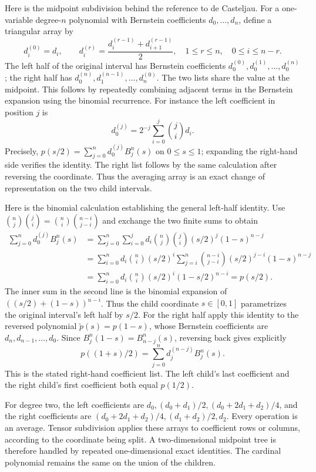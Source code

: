 Here is the midpoint subdivision behind the reference to de Casteljau.
For a one-variable degree-$n$ polynomial with Bernstein coefficients
$d_0,\ldots,d_n$, define a triangular array by
\[
 d_i^{(0)}=d_i,\qquad
 d_i^{(r)}=\frac{d_i^{(r-1)}+d_{i+1}^{(r-1)}}2,
 \quad 1\leq r\leq n,\quad 0\leq i\leq n-r.
\]
The left half of the original interval has Bernstein coefficients
$d_0^{(0)},d_0^{(1)},\ldots,d_0^{(n)}$; the right half has
$d_0^{(n)},d_1^{(n-1)},\ldots,d_n^{(0)}$. The two lists share the
value at the midpoint. This follows by repeatedly combining adjacent
terms in the Bernstein expansion using the binomial recurrence.
For instance the left coefficient in position $j$ is
\[
 d_0^{(j)}=2^{-j}\sum_{i=0}^j\binom ji d_i.
\]
Precisely, $p(s/2)=\sum_{j=0}^n d_0^{(j)}B_j^n(s)$ on
$0\leq s\leq1$; expanding the right-hand side verifies the identity.
The right list
follows by the same calculation after reversing the coordinate.
Thus the averaging array is an exact change of representation on the
two child intervals.

Here is the binomial calculation establishing the general left-half
identity. Use $\binom nj\binom ji=\binom ni\binom{n-i}{j-i}$
and exchange the two finite sums to obtain
\[
 \begin{aligned}
 \sum_{j=0}^n d_0^{(j)}B_j^n(s)
 &=\sum_{j=0}^n\sum_{i=0}^j
     d_i\binom nj\binom ji(s/2)^j(1-s)^{n-j}\\
 &=\sum_{i=0}^n d_i\binom ni(s/2)^i
       \sum_{j=i}^n\binom{n-i}{j-i}
                 (s/2)^{j-i}(1-s)^{n-j}\\
 &=\sum_{i=0}^n d_i\binom ni(s/2)^i
                         (1-s/2)^{n-i}=p(s/2).
 \end{aligned}
\]
The inner sum in the second line is the binomial expansion of
$((s/2)+(1-s))^{n-i}$. Thus the child coordinate $s\in[0,1]$
parametrizes the original interval's left half by $s/2$. For the
right half apply this identity to the reversed polynomial
$\widetilde p(s)=p(1-s)$, whose Bernstein coefficients are
$d_n,d_{n-1},\ldots,d_0$. Since $B_j^n(1-s)=B_{n-j}^n(s)$,
reversing back gives explicitly
\[
 p((1+s)/2)=\sum_{j=0}^n d_j^{(n-j)}B_j^n(s).
\]
This is the stated right-hand coefficient list. The left child's last
coefficient and the right child's first coefficient both equal $p(1/2)$.

For degree two, the left coefficients are
$d_0,(d_0+d_1)/2,(d_0+2d_1+d_2)/4$, and the right coefficients are
$(d_0+2d_1+d_2)/4,(d_1+d_2)/2,d_2$. Every operation is an average.
Tensor subdivision applies these arrays to coefficient rows or columns,
according to the coordinate being split. A two-dimensional midpoint
tree is therefore handled by repeated one-dimensional exact identities.
The cardinal polynomial remains the same on the union of the children.

